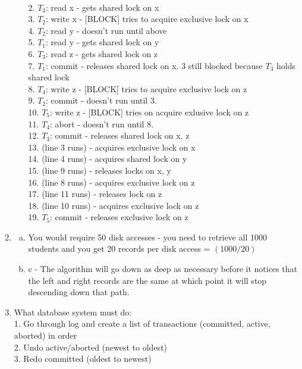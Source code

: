 \documentclass[11pt, oneside]{article}   	%
\begin{document}
\begin{enumerate}
\begin{enumerate}[(a)]
\\ 2. $T_3$: read x - gets shared lock on x
\\ 3. $T_2$: write x - [BLOCK] tries to acquire exclusive lock on x
\\ 4. $T_2$: read y - doesn't run until above
\\ 5. $T_1$: read y - gets shared lock on y
\\ 6. $T_3$: read z - gets shared lock on z
\\ 7. $T_1$: commit - releases shared lock on x. 3 still blocked because $T_3$ holds shared lock
\\ 8. $T_4$: write z - [BLOCK] tries to acquire exclusive lock on z
\\ 9. $T_2$: commit - doesn't run until 3.
\\ 10. $T_5$: write z - [BLOCK] tries on acquire exlusive lock on z
\\ 11. $T_4$: abort - doesn't run until 8.
\\ 12. $T_3$: commit - releases shared lock on x, z
\\ 13. (line 3 runs) - acquires exclusive lock on x
\\ 14. (line 4 runs) - acquires shared lock on y
\\ 15. (line 9 runs) - releases locks on x, y
\\ 16. (line 8 runs) - acquires exclusive lock on z
\\ 17. (line 11 runs) - releases lock on z
\\ 18. (line 10 runs) - acquires exclusive lock on z
\\ 19. $T_5$: commit - releases exclusive lock on z
\end{enumerate}
\item
\begin{enumerate}[(a)]
\item You would require 50 disk accesses - you need to retrieve all 1000 students and you get 20 records per disk access = $(1000/20)$
\item c - The algorithm will go down as deep as necessary before it notices that the left and right records are the same at which point it will stop descending down that path.
\end{enumerate}
\item
What database system must do:
\\1. Go through log and create a list of transactions (committed, active, aborted) in order
\\2. Undo active/aborted (newest to oldest)
\\3. Redo committed (oldest to newest)

\end{enumerate}
\end{document}
